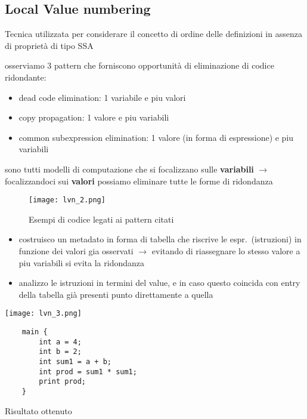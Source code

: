\subsection{Local Value numbering}

Tecnica utilizzata per considerare il concetto di ordine delle definizioni in assenza di propriet\`a di tipo SSA

osserviamo 3 pattern che forniscono opportunit\`a di eliminazione di codice ridondante:
\begin{itemize}
  \item dead code elimination: 1 variabile e piu valori
  \item copy propagation: 1 valore e piu variabili
  \item common subexpression elimination: 1 valore (in forma di espressione) e piu variabili
\end{itemize}

sono tutti modelli di computazione che si focalizzano sulle \textbf{variabili} $\rightarrow$ focalizzandoci sui \textbf{valori} possiamo eliminare tutte le forme di ridondanza

\begin{figure}[h]
  \centering
  \texttt{[image: lvn\_2.png]}
  \caption{Esempi di codice legati ai pattern citati}
\end{figure}

\begin{itemize}
	\item costruisco un metadato in forma di tabella che riscrive le espr.~(istruzioni) in funzione dei valori gia osservati $\rightarrow$ evitando di riassegnare lo stesso valore a piu variabili si evita la ridondanza
	\item analizzo le istruzioni in termini del value, e in caso questo coincida con entry della tabella gi\`a presenti punto direttamente a quella
\end{itemize}

\begin{example}
	\noindent\begin{minipage}[c]{.6\textwidth}
		\texttt{[image: lvn\_3.png]}
	\end{minipage}\hfill
	\begin{minipage}[c]{.3\textwidth}
		\centering
		\begin{lstlisting}
	main {
		int a = 4;
		int b = 2;
		int sum1 = a + b;
		int prod = sum1 * sum1;
		print prod;
	}\end{lstlisting}

	Risultato ottenuto
\end{minipage}
\end{example}



